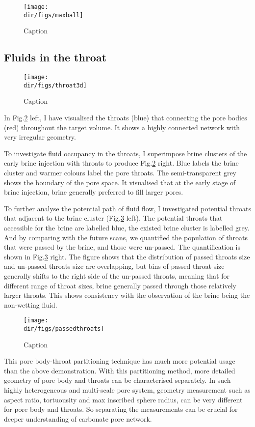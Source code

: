 \begin{figure}
    \centering
    \texttt{[image: \\dir/figs/maxball]}
    \caption{Caption}
    \label{maxball}
\end{figure}

\subsection{Fluids in the throat}
\begin{figure}
    \centering
    \texttt{[image: \\dir/figs/throat3d]}
    \caption{Caption}
    \label{throat3d}
\end{figure}
In Fig.\ref{throat3d} left, I have visualised the throats (blue) that connecting the pore bodies (red) throughout the target volume. It shows a highly connected network with very irregular geometry. 

To investigate fluid occupancy in the throats, I superimpose brine clusters of the early brine injection with throats to produce Fig.\ref{throat3d} right. Blue labels the brine cluster and warmer colours label the pore throats. The semi-transparent grey shows the boundary of the pore space. It visualised that at the early stage of brine injection, brine generally preferred to fill larger pores.

To further analyse the potential path of fluid flow, I investigated potential throats that adjacent to the brine cluster (Fig.\ref{passedthroats} left). The potential throats that accessible for the brine are labelled blue, the existed brine cluster is labelled grey. And by comparing with the future scans, we quantified the population of throats that were passed by the brine, and those were un-passed. The quantification is shown in Fig.\ref{passedthroats} right. The figure shows that the distribution of passed throats size and un-passed throats size are overlapping, but bins of passed throat size generally shifts to the right side of the un-passed throats, meaning that for different range of throat sizes, brine generally passed through those relatively larger throats. This shows consistency with the observation of the brine being the non-wetting fluid.

\begin{figure}
    \centering
    \texttt{[image: \\dir/figs/passedthroats]}
    \caption{Caption}
    \label{passedthroats}
\end{figure}

This pore body-throat partitioning technique has much more potential usage than the above demonstration. With this partitioning method, more detailed geometry of pore body and throats can be characterised separately. In such highly heterogeneous and multi-scale pore system, geometry measurement such as aspect ratio, tortuousity and max inscribed sphere radius, can be very different for pore body and throats. So separating the measurements can be crucial for deeper understanding of carbonate pore network.

